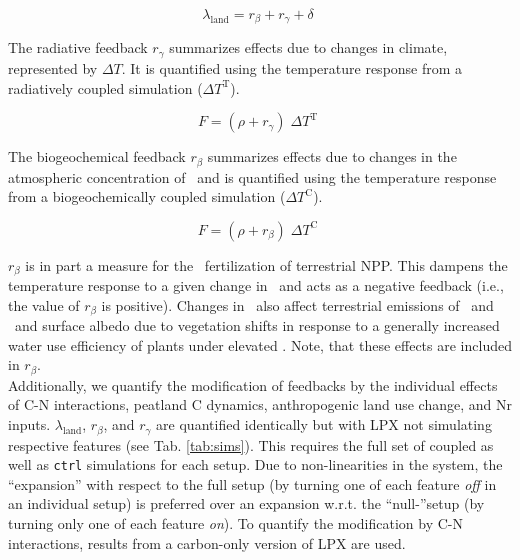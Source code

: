 \documentclass{myreport}
\begin{document}
\begin{equation}
\lambda_\text{land} = r_\beta + r_\gamma + \delta\; %
\end{equation}

The radiative feedback $r_\gamma$ summarizes effects due to changes in climate, represented by $\Delta T$. It is quantified using the temperature response from a radiatively coupled simulation ($\Delta T^{\text{T}}$).

\begin{equation}
F = (\rho + r_\gamma) \; \Delta T^{\text{T}} \; %
\end{equation}

The biogeochemical feedback $r_\beta$ summarizes effects due to changes in the atmospheric concentration of \coo\ and is quantified using the temperature response from a biogeochemically coupled simulation ($\Delta T^{\text{C}}$).

\begin{equation}
F = (\rho + r_\beta) \; \Delta T^{\text{C}} \; %
\end{equation}

$r_\beta$ is in part a measure for the \coo\ fertilization of terrestrial NPP. This dampens the temperature response to a given change in \coo\ and acts as a negative feedback (i.e., the value of $r_\beta$ is positive). Changes in \coo\ also affect terrestrial emissions of \nno\ and \chh\ and surface albedo due to vegetation shifts in response to a generally increased water use efficiency of plants under elevated \coo . Note, that these effects are included in $r_\beta$.\\

Additionally, we quantify the modification of feedbacks by the individual effects of C-N interactions, peatland C dynamics, anthropogenic land use change, and Nr inputs. $\lambda_\text{land}$, $r_\beta$, and $r_\gamma$ are quantified identically but with LPX not simulating respective features (see Tab. \ref{tab:sims}). This requires the full set of coupled as well as {\tt ctrl} simulations for each setup. Due to non-linearities in the system, the ``expansion'' with respect to the full setup (by turning one of each feature {\it off} in an individual setup) is preferred over an expansion w.r.t. the ``null-''setup (by turning only one of each feature {\it on}). To quantify the modification by C-N interactions, results from a carbon-only version of LPX are used.\\
\end{document}
